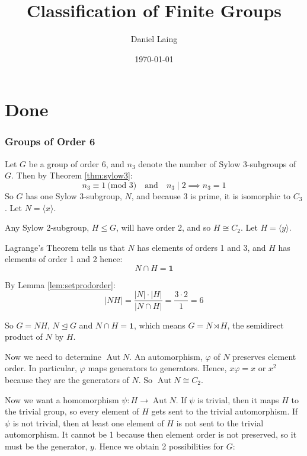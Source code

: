 \documentclass[a4paper, oneside, 12pt, final]{article}
\title{Classification of Finite Groups}
\author{Daniel Laing}
\date{\today}
\theoremstyle{definition}
\DeclareMathOperator{\Aut}{Aut}
\begin{document}
{\maketitle}
{\tableofcontents}

\part{Done}


\section{Groups of Order 6}
Let \(G\) be a group of order 6, and \(n_3\) denote the number of Sylow 3-subgroups of \(G\).
Then by Theorem \ref{thm:sylow3}:
\[n_3 \equiv 1 \ \text{(mod 3)} \quad \text{and} \quad n_3 \mid 2 \implies n_3 = 1\]
So \(G\) has one Sylow 3-subgroup, \(N\), and because 3 is prime, it is isomorphic to \(C_3\).
Let \(N = \langle x \rangle\).

Any Sylow 2-subgroup, \(H \leqslant G\), will have order 2, and so \(H \cong C_2\).
Let \(H = \langle y \rangle\).

Lagrange's Theorem tells us that \(N\) has elements of orders 1 and 3, and \(H\) has elements of
order 1 and 2 hence:
\[N \cap H = \bm{1}\]

By Lemma \ref{lem:setprodorder}:
\[|NH| = \frac{|N| \cdot |H|}{|N \cap H|} = \frac{3 \cdot 2}{1} = 6\]

So \(G = N H\), \(N \unlhd G\) and \(N \cap H = \bm{1}\), which means \(G = N \rtimes H\), the
semidirect product of \(N\) by \(H\).

Now we need to determine \(\Aut{N}\).
An automorphism, \(\varphi\) of \(N\) preserves element order.
In particular, \(\varphi\) maps generators to generators.
Hence, \(x\varphi = x\) or \(x^2\) because they are the generators of \(N\).
So \(\Aut{N} \cong C_2\).

Now we want a homomorphism \(\psi:H \to \Aut{N}\).
If \(\psi\) is trivial, then it maps \(H\) to the trivial group, so every element of \(H\) gets sent
to the trivial automorphism.
If \(\psi\) is not trivial, then at least one element of \(H\) is not sent to the trivial
automorphism.
It cannot be 1 because then element order is not preserved, so it must be the generator, \(y\).
Hence we obtain 2 possibilities for \(G\):
\end{document}
